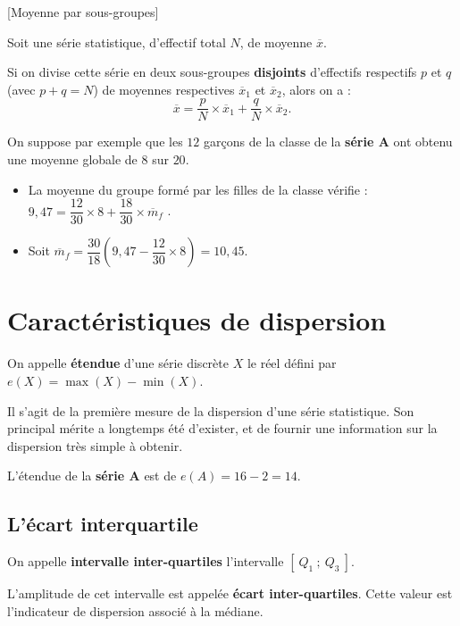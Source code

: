 \begin{prop}{}{}[Moyenne par sous-groupes]

   Soit une série statistique, d'effectif total $N$, de moyenne $\overline{x}$. 
   
   Si on divise cette série en deux sous-groupes \textbf{disjoints} d'effectifs respectifs $p$ et $q$ (avec $p+q=N$) de moyennes respectives $\overline{x}_1$ et $\overline{x}_2$, alors on a : $$\overline{x}=\dfrac{p}{N} \times \overline{x}_1+\dfrac{q}{N} \times \overline{x}_2.$$
\end{prop}

\smallskip

\begin{ex}{}{}
   On suppose par exemple que les $12$ garçons de la classe de la \textbf{série A} ont obtenu une moyenne globale de $8$ sur $20$.
   \begin{itemize}
      \item  La moyenne du groupe formé par les filles de la classe vérifie : $9,47 =\dfrac{12}{30}\times 8+\dfrac{18}{30} \times \overline{m}_f$ .
      \item  Soit $\overline{m}_f=\dfrac{30}{18}\left(9,47-\dfrac{12}{30}\times 8\right)=10,45.$
   \end{itemize}
\end{ex}

\section{Caractéristiques de dispersion}

\begin{defi}{}{}
On appelle \textbf{étendue} d'une série discrète $X$ le réel défini par $e(X)=\max(X)-\min(X)$.
\end{defi}
\medskip

Il s'agit de la première mesure de la dispersion d'une série statistique. Son principal mérite a longtemps été d'exister, et de fournir une information sur la dispersion très simple à obtenir.

\begin{ex}{}{}
L'étendue de la \textbf{série A} est de $e(A)=16-2=14$.
\end{ex}
\medskip

\subsection{L'écart interquartile}

\begin{defi}{}{}
On appelle \textbf{intervalle inter-quartiles} l'intervalle $[~Q_1~;~Q_3~]$. 
   
\noindent L'amplitude de cet intervalle est appelée \textbf{écart inter-quartiles}. Cette valeur est l'indicateur de dispersion associé à la médiane.
\end{defi}
\medskip

